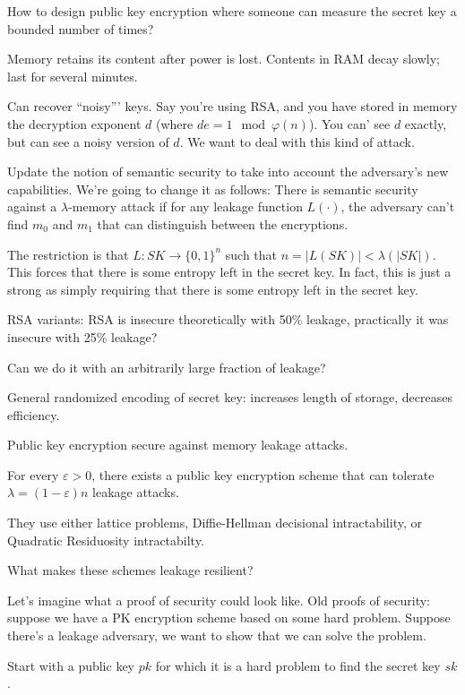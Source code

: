 \documentclass[10pt]{article}
\newcommand{\bit}{\{0,1\}}
\begin{document}
How to design public key encryption where someone can measure the secret key a bounded number of times?

Memory retains its content after power is lost. Contents in RAM decay slowly; last for several minutes.

Can recover ``noisy''' keys. Say you're using RSA, and you have stored in memory the decryption exponent $d$ (where $d e = 1 \mod \varphi(n)$). You can' see $d$ exactly, but can see a noisy version of $d$. We want to deal with this kind of attack.

Update the notion of semantic security to take into account the adversary's new capabilities. We're going to change it as follows: There is semantic security against a $\lambda$-memory attack if for any leakage function $L(\cdot)$, the adversary can't find $m_0$ and $m_1$ that can distinguish between the encryptions.

The restriction is that $L : SK \to \bit^n$ such that $n = |L(SK)| < \lambda(|SK|)$. This forces that there is some entropy left in the secret key. In fact, this is just a strong as simply requiring that there is some entropy left in the secret key.

RSA variants: RSA is insecure theoretically with 50\% leakage, practically it was insecure with 25\% leakage?

Can we do it with an arbitrarily large fraction of leakage?

General randomized encoding of secret key: increases length of storage, decreases efficiency.

Public key encryption secure against memory leakage attacks.

\begin{theorem}
For every $\varepsilon > 0$, there exists a public key encryption scheme that can tolerate $\lambda = (1 - \varepsilon)n$ leakage attacks.
\end{theorem}
They use either lattice problems, Diffie-Hellman decisional intractability, or Quadratic Residuosity intractabilty.

What makes these schemes leakage resilient?

Let's imagine what a proof of security could look like. Old proofs of security: suppose we have a PK encryption scheme based on some hard problem. Suppose there's a leakage adversary, we want to show that we can solve the problem.

Start with a public key $pk$ for which it is a hard problem to find the secret key $sk$.
\end{document}

